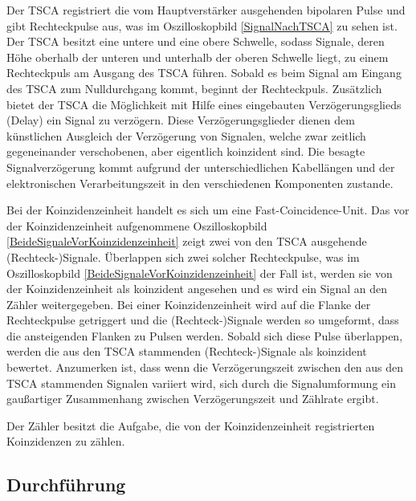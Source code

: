 Der TSCA registriert die vom Hauptverstärker ausgehenden bipolaren Pulse und gibt Rechteckpulse aus, was im Oszilloskopbild \ref{SignalNachTSCA} zu sehen ist.
Der TSCA besitzt eine untere und eine obere Schwelle, sodass Signale, deren Höhe oberhalb der unteren und unterhalb der oberen Schwelle liegt, zu einem Rechteckpuls am Ausgang des TSCA führen.
Sobald es beim Signal am Eingang des TSCA zum Nulldurchgang kommt, beginnt der Rechteckpuls.
Zusätzlich bietet der TSCA die Möglichkeit mit Hilfe eines eingebauten Verzögerungsglieds (Delay) ein Signal zu verzögern.
Diese Verzögerungsglieder dienen dem künstlichen Ausgleich der Verzögerung von Signalen, welche zwar zeitlich gegeneinander verschobenen, aber eigentlich koinzident sind.
Die besagte Signalverzögerung kommt aufgrund der unterschiedlichen Kabellängen und der elektronischen Verarbeitungszeit in den verschiedenen Komponenten zustande.

Bei der Koinzidenzeinheit handelt es sich um eine \glqq Fast-Coincidence-Unit\grqq .
Das vor der Koinzidenzeinheit aufgenommene Oszilloskopbild \ref{BeideSignaleVorKoinzidenzeinheit} zeigt zwei von den TSCA ausgehende (Rechteck-)Signale.
Überlappen sich zwei solcher Rechteckpulse, was im Oszilloskopbild \ref{BeideSignaleVorKoinzidenzeinheit} der Fall ist, werden sie von der Koinzidenzeinheit als koinzident angesehen und es wird ein Signal an den Zähler weitergegeben.
Bei einer Koinzidenzeinheit wird auf die Flanke der Rechteckpulse getriggert und die (Rechteck-)Signale werden so umgeformt, dass die ansteigenden Flanken zu Pulsen werden.
Sobald sich diese Pulse überlappen, werden die aus den TSCA stammenden (Rechteck-)Signale als koinzident bewertet.
Anzumerken ist, dass wenn die Verzögerungszeit zwischen den aus den TSCA stammenden Signalen variiert wird, sich durch die Signalumformung ein gaußartiger Zusammenhang zwischen Verzögerungszeit und Zählrate ergibt.

Der Zähler besitzt die Aufgabe, die von der Koinzidenzeinheit registrierten Koinzidenzen zu zählen.

\subsection{Durchführung}

